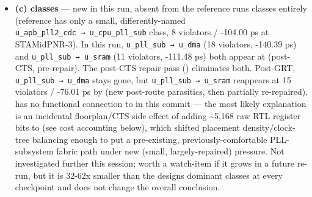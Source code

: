\begin{record}
\begin{itemize}
  cardinality signature) does \textbf{not} appear anywhere in this
  violator list --- 0 matches --- so \textquotesingle s fix
  continues to hold with no reopening needed at this design point.
\item
  \textbf{(c)  classes} --- new in this run, absent from
  the reference run\textquotesingle s classes entirely (reference has
  only a small, differently-named
  \texttt{u\_\allowbreak{}apb\_\allowbreak{}pll2\_\allowbreak{}cdc\ →\ u\_\allowbreak{}cpu\_\allowbreak{}pll\_\allowbreak{}sub}
  class, 8 violators / -104.00 ps at STAMidPNR-3). In this run,
  \texttt{u\_\allowbreak{}pll\_\allowbreak{}sub\ →\ u\_\allowbreak{}dma}
  (18 violators, -140.39 ps) and
  \texttt{u\_\allowbreak{}pll\_\allowbreak{}sub\ →\ u\_\allowbreak{}sram}
  (11 violators, -111.48 ps) both appear at 
  (post-CTS, pre-repair). The post-CTS repair pass ()
  eliminates both. Post-GRT,
  \texttt{u\_\allowbreak{}pll\_\allowbreak{}sub\ →\ u\_\allowbreak{}dma}
  stays gone, but
  \texttt{u\_\allowbreak{}pll\_\allowbreak{}sub\ →\ u\_\allowbreak{}sram}
  reappears at 15 violators / -76.01 ps by  (new
  post-route parasitics, then partially re-repaired). 
  has no functional connection to  in this
  commit --- the most likely explanation is an incidental
  floorplan/\allowbreak{}CTS side effect of adding \textasciitilde5,168
  raw RTL register bits to  (see cost accounting below),
  which shifted placement density/\allowbreak{}clock-tree balancing
  enough to put a pre-existing, previously-comfortable PLL-subsystem
  fabric path under new (small, largely-repaired) pressure. Not
  investigated further this session; worth a watch-item if it grows in a
  future re-run, but it is 32-62x smaller than the
  design\textquotesingle s dominant classes at every checkpoint and does
  not change the overall conclusion.
\end{itemize}


\end{record}
